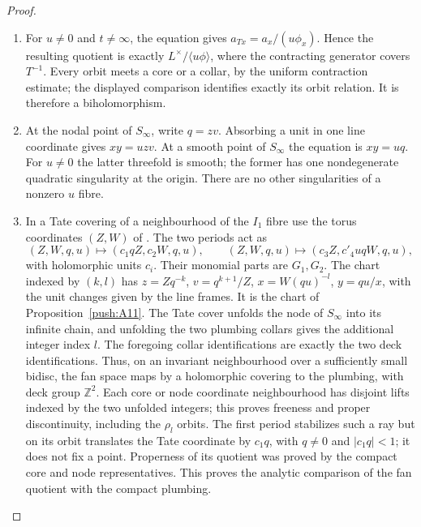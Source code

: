 \begin{proof}
\begin{enumerate}[label=\arabic*.,leftmargin=*]
\item For $u\ne0$ and $t\ne\infty$, the equation gives
$a_{Tx}=a_x/(u\phi_x)$. Hence the resulting quotient is exactly
$L^\times/\langle u\phi\rangle$, where the contracting generator
covers $T^{-1}$. Every orbit meets a core or a collar, by the
uniform contraction estimate; the displayed comparison identifies
exactly its orbit relation. It is therefore a biholomorphism.

\item At the nodal point of $S_\infty$, write $q=zv$. Absorbing a unit
in one line coordinate gives $xy=uzv$. At a smooth point of
$S_\infty$ the equation is $xy=uq$. For $u\ne0$ the latter
threefold is smooth; the former has one nondegenerate quadratic
singularity at the origin. There are no other singularities of a
nonzero $u$ fibre.

\item In a Tate covering of a neighbourhood of the $I_1$
fibre use the torus coordinates $(Z,W)$ of
\citet[Proposition~2.7, p.~6]{Engel2026}.
The two periods act as
\[
 (Z,W,q,u)\longmapsto(c_1qZ,c_2W,q,u),\qquad
 (Z,W,q,u)\longmapsto(c_3Z,c'_4uqW,q,u),
\]
with holomorphic units $c_i$. Their monomial parts are $G_1,G_2$.
The chart indexed by $(k,l)$ has
$z=Zq^{-k}$, $v=q^{k+1}/Z$, $x=W(qu)^{-l}$,
$y=qu/x$, with the unit changes given by the line
frames. It is the chart of Proposition~\ref{push:A11}.
The Tate cover unfolds the node of $S_\infty$ into its infinite
chain, and unfolding the two plumbing collars gives the additional
integer index $l$. The foregoing collar identifications are exactly
the two deck identifications. Thus, on an invariant neighbourhood
over a sufficiently small bidisc, the fan space maps by a
holomorphic covering to the plumbing, with deck group $\mathbb Z^2$.
Each core or node coordinate neighbourhood has disjoint lifts
indexed by the two unfolded integers; this proves freeness and
proper discontinuity, including the $\rho_l$ orbits. The first
period stabilizes such a ray but on its orbit translates the Tate
coordinate by $c_1q$, with $q\ne0$ and $|c_1q|<1$; it does not
fix a point. Properness of its quotient was proved by the compact
core and node representatives. This proves the analytic comparison of the fan quotient with the compact plumbing.


\end{enumerate}
\end{proof}
